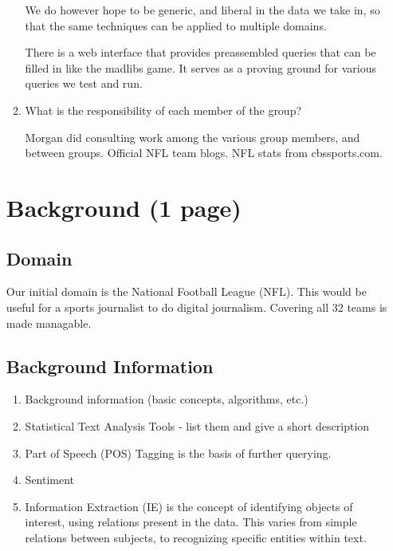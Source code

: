 \documentclass{article}
\begin{document}
\begin{enumerate}
\begin{enumerate}
    We do however hope to be generic, and liberal in the data we take in, so that the same techniques can be applied to multiple domains.

    There is a web interface that provides preassembled queries that can be filled in like the madlibs game.
    It serves as a proving ground for various queries we test and run.

  \item What is the responsibility of each member of the group?



    Morgan did consulting work among the various group members, and between groups.
    Official NFL team blogs. NFL stats from cbssports.com.
  \end{enumerate}

  \section{Background (1 page)}
  \subsection{Domain}

  Our initial domain is the National Football League (NFL).
  This would be useful for a sports journalist to do digital journalism.
  Covering all 32 teams is made managable.

  \subsection{Background Information}
  \begin{enumerate}
  \item Background information (basic concepts, algorithms, etc.)



  \item Statistical Text Analysis Tools - list them and give a short description


  \item Part of Speech (POS) Tagging is the basis of further querying.


  \item Sentiment


  \item Information Extraction (IE) is the concept of identifying objects of interest,
    using relations present in the data.
    This varies from simple relations between subjects,
    to recognizing specific entities within text.



\end{enumerate}
\end{enumerate}
\end{document}
